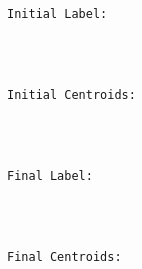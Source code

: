 \documentclass[11pt]{article}
\begin{document}
    \begin{center}
    \end{center}
    { \hspace*{\fill} \\}
    
    \begin{Verbatim}[commandchars=\\\{\}]

Initial Label:

    \end{Verbatim}

    \begin{center}
    \end{center}
    { \hspace*{\fill} \\}
    
    \begin{Verbatim}[commandchars=\\\{\}]

Initial Centroids:

    \end{Verbatim}

    \begin{center}
    \end{center}
    { \hspace*{\fill} \\}
    
    \begin{Verbatim}[commandchars=\\\{\}]

Final Label:

    \end{Verbatim}

    \begin{center}
    \end{center}
    { \hspace*{\fill} \\}
    
    \begin{Verbatim}[commandchars=\\\{\}]

Final Centroids:

    \end{Verbatim}
\end{document}
